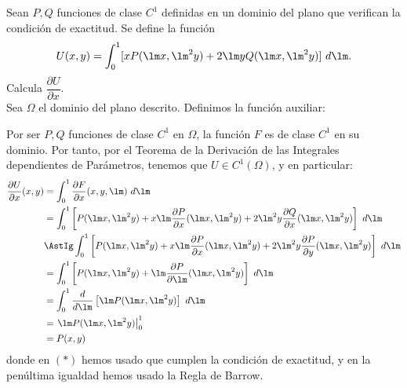 \documentclass[12pt]{article}
\begin{document}
\begin{ejercicio}
    Sean $P,Q$ funciones de clase $C^1$ definidas en un dominio del plano que verifican la condición de exactitud. Se define la función
    \begin{equation*}
        U(x,y)=\int_{0}^{1}[xP(\lm x,\lm^2 y)+2\lm yQ(\lm x,\lm^2 y)]~d\lm.
    \end{equation*}
    Calcula $\dfrac{\partial U}{\partial x}$.\\

    Sea $\Omega$ el dominio del plano descrito. Definimos la función auxiliar:

    Por ser $P,Q$ funciones de clase $C^1$ en $\Omega$, la función $F$ es de clase $C^1$ en su dominio. Por tanto, por el Teorema de la Derivación de las Integrales dependientes de Parámetros, tenemos que $U\in C^1(\Omega)$, y en particular:
    \begin{align*}
        \dfrac{\partial U}{\partial x}(x,y)&=\int_{0}^{1}\dfrac{\partial F}{\partial x}(x,y,\lm)~d\lm\\
        &=\int_{0}^{1}\left[P(\lm x,\lm^2 y)+x\lm \dfrac{\partial P}{\partial x}(\lm x,\lm^2 y)+2\lm^2 y\dfrac{\partial Q}{\partial x}(\lm x,\lm^2 y)\right]~d\lm\\
        & \AstIg\int_{0}^{1}\left[P(\lm x,\lm^2 y)+x\lm \dfrac{\partial P}{\partial x}(\lm x,\lm^2 y)+2\lm^2 y\dfrac{\partial P}{\partial y}(\lm x,\lm^2 y)\right]~d\lm\\
        & = \int_{0}^{1}\left[P(\lm x,\lm^2 y)+\lm \dfrac{\partial P}{\partial \lm}(\lm x,\lm^2 y)\right]~d\lm\\
        & = \int_{0}^{1}\dfrac{d}{d\lm}\left[\lm P(\lm x,\lm^2 y)\right]~d\lm\\
        & = \left.\lm P(\lm x,\lm^2 y)\right|_{0}^{1}\\
        & = P(x,y)
    \end{align*}
    donde en $(\ast)$ hemos usado que cumplen la condición de exactitud, y en la penúltima igualdad hemos usado la Regla de Barrow.
\end{ejercicio}

    
\end{document}
